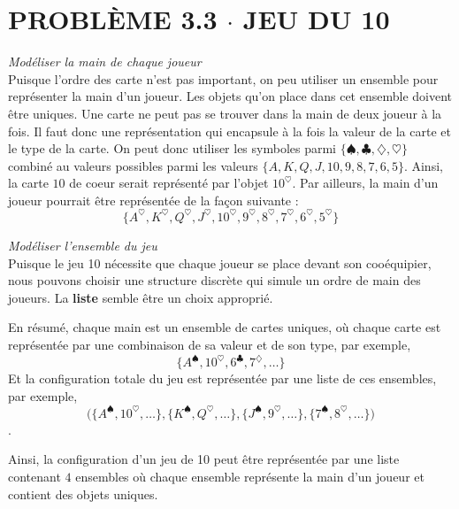 \documentclass[8pt]{report}
\begin{document}
        \section*{\textnormal{PROBLÈME 3.3 \;\;\;\; $\cdot$ \;\;\;\; JEU DU 10 }} 

        \noindent \textcolor{myb}{\textit{Modéliser la main de chaque joueur}}\\ 
        \indent Puisque l'ordre des carte n'est pas important, on peu utiliser un ensemble pour représenter la main 
        d'un joueur. Les objets qu'on place dans cet ensemble doivent être uniques. Une carte ne peut pas se trouver 
        dans la main de deux joueur à la fois. Il faut donc une représentation qui encapsule à la fois la valeur de la 
        carte et le type de la carte. On peut donc utiliser les symboles parmi  
        $\{\spadesuit, \clubsuit, \diamondsuit, \heartsuit\}$ combiné au valeurs possibles parmi les valeurs 
        $\{A, K, Q, J, 10, 9, 8, 7, 6, 5 \}$. Ainsi, la carte $10$ de coeur serait représenté par l'objet $10^\heartsuit$. 
        Par ailleurs, la main d'un joueur pourrait être représentée de la façon suivante : 
        \[ \{A^\heartsuit, K^\heartsuit, Q^\heartsuit, J^\heartsuit, 10^\heartsuit, 9^\heartsuit, 8^\heartsuit, 7^\heartsuit, 6^\heartsuit, 5^\heartsuit \} \]

        \noindent \textcolor{myb}{\textit{Modéliser l'ensemble du jeu}} \\
        \indent Puisque le jeu 10 nécessite que chaque joueur se place devant son cooéquipier, nous pouvons choisir une 
        structure discrète qui simule un ordre de main des joueurs. La \textbf{liste} semble être un choix approprié.

    En résumé, chaque main est un ensemble de cartes uniques, où chaque carte est représentée par une combinaison de sa valeur et de son type, par exemple, \[ \{A^\spadesuit, 10^\heartsuit, 6^\clubsuit, 7^\diamondsuit, \ldots\} \] Et la configuration totale du jeu est représentée par une liste de ces ensembles, par exemple, \[ \Big(\{A^\spadesuit, 10^\heartsuit, \ldots\}, \{K^\spadesuit, Q^\heartsuit, \ldots\}, \{J^\spadesuit, 9^\heartsuit, \ldots\}, \{7^\spadesuit, 8^\heartsuit, \ldots\}\Big) \].
        
        \begin{Reponse}{}{}
        Ainsi, la configuration d'un jeu de 10 peut être représentée par une liste contenant $4$ ensembles où chaque 
        ensemble représente la main d'un joueur et contient des objets uniques.       
        \end{Reponse}
\end{document}
